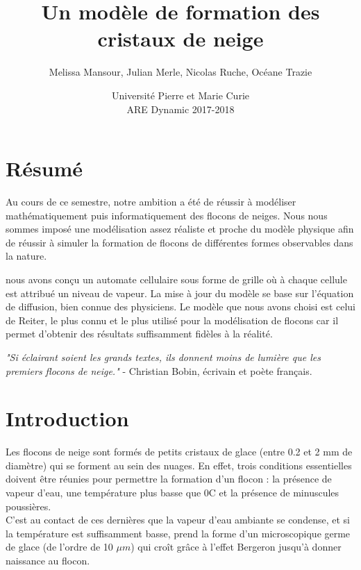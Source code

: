 \documentclass[a4paper,12pt,twoside]{report}
\newenvironment{adjustwidth}[2]{
 \begin{list}{}{
  \setlength{\topsep}{0em}
  \setlength{\itemsep}{0em}
  \setlength{\parsep}{\parskip}
  \setlength{\labelsep}{0em}
  \setlength{\leftmargin}{#1}
  \setlength{\rightmargin}{#2}
  \setlength{\listparindent}{\parindent}
  \setlength{\labelwidth}{0em}
  \setlength{\itemindent}{\parindent}%
 }
 \item
}{\end{list}}
\newenvironment{indented}[1][1.5cm]{\begin{adjustwidth}{#1}{0cm}}{\end{adjustwidth}}
\begin{document}
\title{\LARGE {\bf Un modèle de formation des cristaux de neige}\\
 \vspace*{6mm}
}

\author{Melissa Mansour, Julian Merle, Nicolas Ruche, Océane Trazie}
\date{Université Pierre et Marie Curie\\ \vspace*{4cm} ARE Dynamic 2017-2018}


\maketitle
\chapter*{Résumé}Au cours de ce semestre, notre ambition a été de réussir à modéliser mathématiquement puis informatiquement des flocons de neiges. Nous nous sommes imposé une modélisation assez réaliste et proche du modèle physique afin de réussir à simuler la formation de flocons de différentes formes observables dans la nature.

nous avons conçu un automate cellulaire sous forme de grille où à chaque cellule est attribué un niveau de vapeur. La mise à jour du modèle se base sur l’équation de diffusion, bien connue des physiciens.
\medbreak
Le modèle que nous avons choisi est celui de Reiter, le plus connu et le plus utilisé pour la modélisation de flocons car il permet d’obtenir des résultats suffisamment fidèles à la réalité.


\newpage
\begin{flushright}
\begin{indented}[4cm]
\emph{"Si éclairant soient les grands textes, ils donnent moins de lumière que les premiers flocons de neige."} - Christian Bobin, écrivain et poète français.
\end{indented}
\end{flushright}

\tableofcontents
\chapter*{Introduction}Les flocons de  neige sont formés de petits cristaux de glace (entre 0.2 et 2 mm de diamètre) qui se forment au sein des nuages. En effet, trois conditions essentielles doivent être réunies pour permettre la formation d’un flocon : la présence de vapeur d'eau, une température plus basse que 0\degre C et la présence de minuscules poussières.\\
C’est au contact de ces dernières que la vapeur d’eau ambiante se condense, et si la température est suffisamment basse, prend la forme d’un microscopique germe de glace (de l’ordre de 10 $\mu m$) qui croît grâce à l’effet Bergeron jusqu’à donner naissance au flocon.
\end{document}
